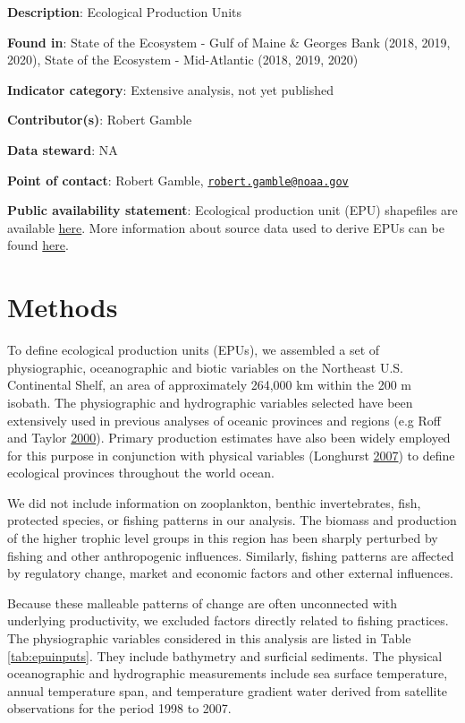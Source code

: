 \documentclass[
]{book}
\begin{document}
\textbf{Description}: Ecological Production Units

\textbf{Found in}: State of the Ecosystem - Gulf of Maine \& Georges Bank (2018, 2019, 2020), State of the Ecosystem - Mid-Atlantic (2018, 2019, 2020)

\textbf{Indicator category}: Extensive analysis, not yet published

\textbf{Contributor(s)}: Robert Gamble

\textbf{Data steward}: NA

\textbf{Point of contact}: Robert Gamble, \href{mailto:robert.gamble@noaa.gov}{\nolinkurl{robert.gamble@noaa.gov}}

\textbf{Public availability statement}: Ecological production unit (EPU) shapefiles are available \href{https://github.com/NOAA-EDAB/tech-doc/tree/master/gis}{here}. More information about source data used to derive EPUs can be found \href{https://www.integratedecosystemassessment.noaa.gov/sites/default/files/pdf/ne-ecological-production-units-paper.pdf}{here}.

\hypertarget{methods-14}{%
\section{Methods}\label{methods-14}}

To define ecological production units (EPUs), we assembled a set of physiographic, oceanographic and biotic variables on the Northeast U.S. Continental Shelf, an area of approximately 264,000 km within the 200 m isobath. The physiographic and hydrographic variables selected have been extensively used in previous analyses of oceanic provinces and regions (e.g Roff and Taylor \protect\hyperlink{ref-Roff2000}{2000}). Primary production estimates have also been widely employed for this purpose in conjunction with physical variables (Longhurst \protect\hyperlink{ref-Longhurst2007}{2007}) to define ecological provinces throughout the world ocean.

We did not include information on zooplankton, benthic invertebrates, fish, protected species, or fishing patterns in our analysis. The biomass and production of the higher trophic level groups in this region has been sharply perturbed by fishing and other anthropogenic influences. Similarly, fishing patterns are affected by regulatory change, market and economic factors and other external influences.

Because these malleable patterns of change are often unconnected with underlying productivity, we excluded factors directly related to fishing practices. The physiographic variables considered in this analysis are listed in Table \ref{tab:epuinputs}. They include bathymetry and surficial sediments. The physical oceanographic and hydrographic measurements include sea surface temperature, annual temperature span, and temperature gradient water derived from satellite observations for the period 1998 to 2007.
\end{document}
